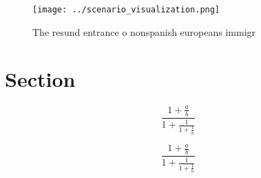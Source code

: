 \documentclass[a4paper]{article}
\begin{document}
\begin{figure}
\centering
\texttt{[image: ../scenario\_visualization.png]}
\caption{The resund entrance o nonspanish europeans immigr
}
\end{figure}
 
\section{Section}

\[ \frac{1+\frac{a}{b}}{1+\frac{1}{1+\frac{1}{a}}} \]

\[ \frac{1+\frac{a}{b}}{1+\frac{1}{1+\frac{1}{a}}} \]
\end{document}
